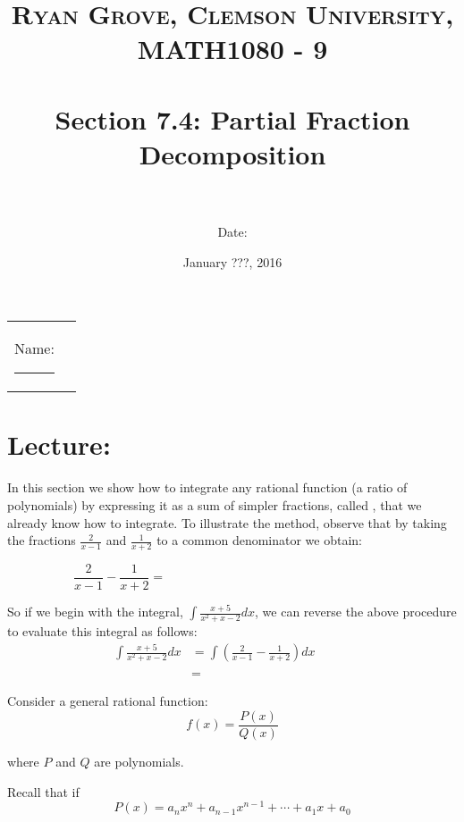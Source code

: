 \documentclass[paper=a4, fontsize=11pt]{scrartcl} %
\title{	
\normalfont \normalsize 
\textsc{Ryan Grove, Clemson University, MATH1080 - 9} \\ [25pt] %
\horrule{0.5pt} \\[0.4cm] %
\huge Section 7.4: Partial Fraction Decomposition \\ %
\horrule{2pt} \\[0.5cm] %
}
\author{Date:} %
\date{\normalsize January ???, 2016} %
\numberwithin{equation}{section} %
\numberwithin{figure}{section} %
\numberwithin{table}{section} %
\newcommand{\ds}{\displaystyle}
\begin{document}
\maketitle %

\begin{flushleft}
\begin{tabular}{l l}
Name: \rule{3.2in}{.01cm}  & {}%
\end{tabular}
\end{flushleft}


\section*{\textbf{Lecture:}}

In this section we show how to integrate any rational function (a ratio of polynomials) by expressing it as a sum of simpler fractions, called \underline{\hspace{1.25in}} \underline{\hspace{1.25in}}, that we already know how to integrate. To illustrate the method, observe that by taking the fractions $\ds\frac{2}{x-1}$ and $\ds\frac{1}{x+2}$ to a common denominator we obtain:

\[\ds\frac{2}{x-1} - \ds\frac{1}{x+2} = \hspace{3in}\]

\indent

So if we begin with the integral, $\ds\int \ds\frac{x+5}{x^2+x-2}dx$, we can reverse the above procedure to evaluate this integral as follows:
\begin{align*}
\ds\int \ds\frac{x+5}{x^2 +x-2}dx &= \ds\int\left(\ds\frac{2}{x-1} - \ds\frac{1}{x+2}\right)dx\\
&\text{ }\\
&= \hspace{2in}
\end{align*}

Consider a general rational function:
\[f(x) = \ds\frac{P(x)}{Q(x)}\]

where $P$ and $Q$ are polynomials.\\
\indent

Recall that if 
\[P(x) = a_n x^n + a_{n-1}x^{n-1} + \cdots + a_1 x + a_0\]
\end{document}
